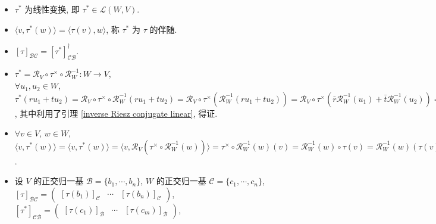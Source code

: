 \documentclass{note}
\begin{document}
\begin{thm}[(课本定理 10.1)]\label{thm-10.1}
    \begin{itemize}
        \item[(1)] $\tau^*$ 为线性变换, 即 $\tau^*\in\mathcal{L}(W,V)$.
        \item[(2)] $\langle v,\tau^*(w)\rangle=\langle\tau(v),w\rangle$, 称 $\tau^*$ 为 $\tau$ 的伴随.
        \item[(3)] $[\tau]_{\mathcal{BC}}=[\tau^*]_{\mathcal{CB}}^{\dagger}$.
    \end{itemize}
\end{thm}
\begin{pf}
    \begin{itemize}
        \item[(1)] $\tau^*=\mathcal{R}_V\circ\tau^{\times}\circ\mathcal{R}_W^{-1}:W\rightarrow V$,\\
        $\forall u_1,u_2\in W$, $\tau^*(ru_1+tu_2)=\mathcal{R}_V\circ\tau^{\times}\circ\mathcal{R}_W^{-1}(ru_1+tu_2)=\mathcal{R}_V\circ\tau^{\times}(\mathcal{R}_W^{-1}(ru_1+tu_2))=\mathcal{R}_V\circ\tau^{\times}(\bar{r}\mathcal{R}_W^{-1}(u_1)+\bar{t}\mathcal{R}_W^{-1}(u_2))=\mathcal{R}_V(\tau^{\times}(\bar{r}\mathcal{R}_W^{-1}(u_1)+\bar{t}\mathcal{R}_W^{-1}(u_2)))=\mathcal{R}_V(\bar{r}\tau^{\times}(\mathcal{R}_W^{-1}(u_1))+\bar{t}\tau^{\times}(\mathcal{R}_W^{-1}(u_2)))=r\mathcal{R}_V(\tau^{\times}(\mathcal{R}_W^{-1}(u_1)))+t\mathcal{R}_V(\tau^{\times}(\mathcal{R}_W^{-1}(u_2)))=r\tau^*(u_1)+t\tau^*(u_2)$, 其中利用了引理 \ref{inverse Riesz conjugate linear}, 得证.
        \item[(2)] $\forall v\in V$, $w\in W$, $\langle v,\tau^*(w)\rangle=\langle v,\tau^*(w)\rangle=\langle v,\mathcal{R}_V(\tau^{\times}\circ\mathcal{R}_W^{-1}(w))\rangle=\tau^{\times}\circ\mathcal{R}_W^{-1}(w)(v)=\mathcal{R}_W^{-1}(w)\circ\tau(v)=\mathcal{R}_W^{-1}(w)(\tau(v))=\langle\tau(v),w\rangle$.
        \item[(3)] 设 $V$ 的正交归一基 $\mathcal{B}=\{b_1,\cdots,b_n\}$, $W$ 的正交归一基 $\mathcal{C}=\{c_1,\cdots,c_n\}$,\\
        $[\tau]_{\mathcal{BC}}=\begin{pmatrix}
            [\tau(b_1)]_{\mathcal{C}}&\cdots&[\tau(b_n)]_{\mathcal{C}}
        \end{pmatrix}$, $[\tau^*]_{\mathcal{CB}}=\begin{pmatrix}
            [\tau(c_1)]_{\mathcal{B}}&\cdots&[\tau(c_m)]_{\mathcal{B}}
        \end{pmatrix}$,\\

\end{itemize}
\end{pf}
\end{document}
